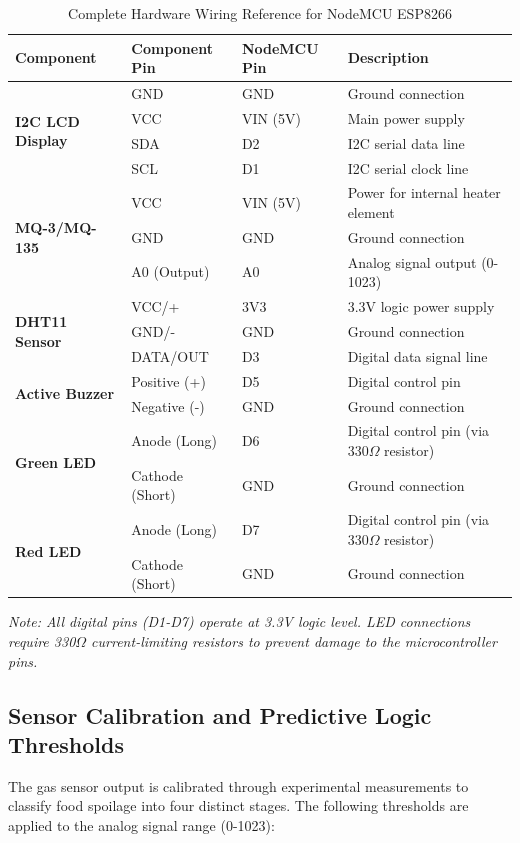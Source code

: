 \begin{table}[H]
	\centering
	\caption{Complete Hardware Wiring Reference for NodeMCU ESP8266}
	\label{tab:complete_wiring_reference}
	\small
	\begin{tabular}{|l|l|l|l|}
		\hline
		\textbf{Component} & \textbf{Component Pin} & \textbf{NodeMCU Pin} & \textbf{Description} \\ \hline
		\multirow{4}{*}{\textbf{I2C LCD Display}} & GND & GND & Ground connection \\ \cline{2-4}
		& VCC & VIN (5V) & Main power supply \\ \cline{2-4}
		& SDA & D2 & I2C serial data line \\ \cline{2-4}
		& SCL & D1 & I2C serial clock line \\ \hline
		\multirow{3}{*}{\textbf{MQ-3/MQ-135}} & VCC & VIN (5V) & Power for internal heater element \\ \cline{2-4}
		& GND & GND & Ground connection \\ \cline{2-4}
		& A0 (Output) & A0 & Analog signal output (0-1023) \\ \hline
		\multirow{3}{*}{\textbf{DHT11 Sensor}} & VCC/+ & 3V3 & 3.3V logic power supply \\ \cline{2-4}
		& GND/- & GND & Ground connection \\ \cline{2-4}
		& DATA/OUT & D3 & Digital data signal line \\ \hline
		\multirow{2}{*}{\textbf{Active Buzzer}} & Positive (+) & D5 & Digital control pin \\ \cline{2-4}
		& Negative (-) & GND & Ground connection \\ \hline
		\multirow{2}{*}{\textbf{Green LED}} & Anode (Long) & D6 & Digital control pin (via 330$\Omega$ resistor) \\ \cline{2-4}
		& Cathode (Short) & GND & Ground connection \\ \hline
		\multirow{2}{*}{\textbf{Red LED}} & Anode (Long) & D7 & Digital control pin (via 330$\Omega$ resistor) \\ \cline{2-4}
		& Cathode (Short) & GND & Ground connection \\ \hline
	\end{tabular}
\end{table}

\textit{Note: All digital pins (D1-D7) operate at 3.3V logic level. LED connections require 330$\Omega$ current-limiting resistors to prevent damage to the microcontroller pins.}

\subsection{Sensor Calibration and Predictive Logic Thresholds}
The gas sensor output is calibrated through experimental measurements to classify food spoilage into four distinct stages. The following thresholds are applied to the analog signal range (0-1023):

